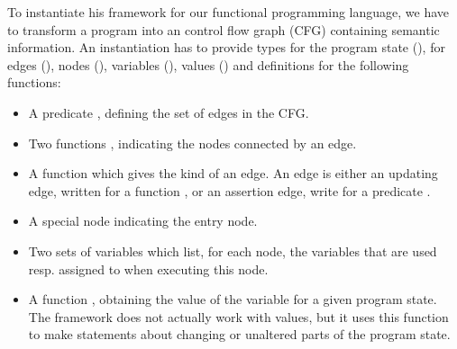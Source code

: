 \documentclass[a4paper,halfparskip,DIV=10,11pt]{scrbook}
\begin{document}
To instantiate his framework for our functional programming language, we have to transform a program into an control flow graph (CFG) containing semantic information. An instantiation has to provide types for the program state (), for edges (), nodes (), variables (), values () and definitions for the following functions:
\begin{itemize}
\item A predicate , defining the set of edges in the CFG. 
\item Two functions , indicating the nodes connected by an edge.
\item A function  which gives the kind of an edge. An edge is either an updating edge, written  for a function , or an assertion edge, write  for a predicate .
\item A special node  indicating the entry node.
\item Two sets of variables  which list, for each node, the variables that are used resp. assigned to when executing this node.
\item A function , obtaining the value of the variable for a given program state. The framework does not actually work with values, but it uses this function to make statements about changing or unaltered parts of the program state.
\end{itemize}
\end{document}
